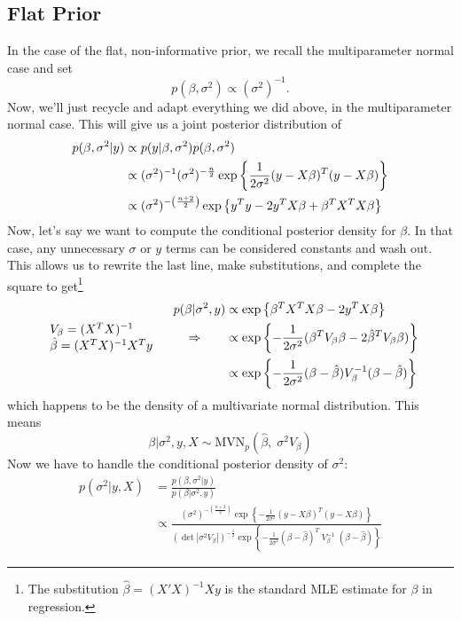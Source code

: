 \documentclass[12pt]{article}
\begin{document}
\subsection{Flat Prior}

In the case of the flat, non-informative prior, we recall the 
multiparameter normal case and set
   \[ p(\beta, \sigma^2) \propto (\sigma^2)^{-1}.\]
Now, we'll just recycle and adapt everything we did above, 
in the multiparameter normal case. This will give us a 
joint posterior distribution of
\begin{align}
   p(\beta, \sigma^2 | y) &\propto 
   p(y | \beta, \sigma^2 ) p(\beta, \sigma^2) \notag\\
   &\propto (\sigma^2)^{-1} (\sigma^2)^{-\frac{n}{2}}
      \exp\left\{ \frac{1}{2\sigma^2} 
   (y - X\beta)^T (y-X\beta)\right\} \notag\\
   &\propto (\sigma^2)^{-\left(\frac{n+2}{2}\right)} 
      \exp\left\{ y^T y-2 y^T X\beta+\beta^T X^T X \beta\right\} \notag
\end{align}
Now, let's say we want to compute the conditional posterior density
for $\beta$.  In that case, any unnecessary
$\sigma$ or $y$ terms can be considered constants
and wash out. This allows us to rewrite the last line, make 
substitutions, and complete the square
to get\footnote{The substitution $\hat{\beta} =
(X'X)^{-1} X y$ is the standard MLE estimate for $\beta$ in 
regression.}
\begin{align}
   p(\beta | \sigma^2, y) &\propto \exp\left\{ \beta^T X^T X \beta -
      2y^T X\beta\right\} \notag\\
   \begin{tabular}{l} $V_\beta = (X^T X)^{-1}$ \\ $\hat{\beta} =
      (X^T X)^{-1} X^T y$ \end{tabular} \qquad\Rightarrow \qquad  
      &\propto 
      \exp\left\{ -\frac{1}{2\sigma^2} (\beta^T V_\beta \beta  - 
      2\hat{\beta}^T V_\beta \beta) \right\} \notag\\
   &\propto \exp\left\{ -\frac{1}{2\sigma^2} (\beta - \hat{\beta})
   V_\beta^{-1} (\beta - \hat{\beta}) \right\}\notag
\end{align}
which happens to be the density of a multivariate normal distribution.
This means 
\[ \beta | \sigma^2, y, X \sim 
   \text{MVN}_p(\hat{\beta},\;\sigma^2 V_\beta)
   \]
Now we have to handle the conditional posterior density of $\sigma^2$:
\begin{align*}
   p(\sigma^2 | y, X) &= \frac{ p(\beta, \sigma^2 | y)}{p(\beta |
      \sigma^2, y)} \\
   &\propto \frac{ (\sigma^2)^{-\left(\frac{n+2}{2}\right)} 
   \exp\left\{ -\frac{1}{2\sigma^2} (y-X\beta)^T(y - X\beta)\right\}}{
	 (\det|\sigma^2 V_\beta|)^{-\frac{1}{2}} 
	 \exp\left\{ -\frac{1}{2\sigma^2} (\beta - \hat{\beta})^T
	 \; V^{-1}_\beta\; (\beta - \hat{\beta})\right\}
      }
\end{align*}
\end{document}
